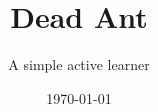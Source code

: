 \documentclass[t,12pt]{beamer}
\title[]{\Huge Dead Ant}
\subtitle{A simple active learner}
\date{\today}
\begin{document}
\begin{frame}
  \titlepage
\end{frame}
\end{document}
